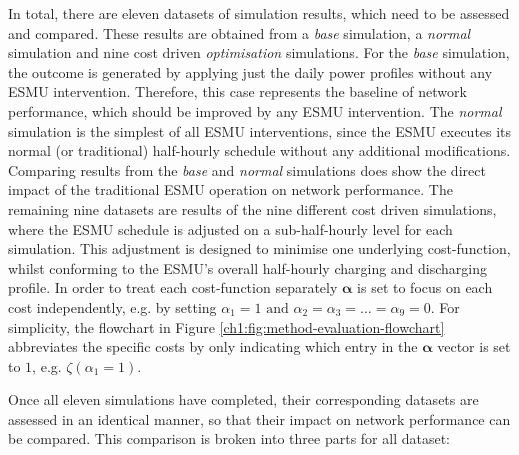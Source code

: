 

In total, there are eleven datasets of simulation results, which need to be assessed and compared.
These results are obtained from a \textit{base} simulation, a \textit{normal} simulation and nine cost driven \textit{optimisation} simulations.
For the \textit{base} simulation, the outcome is generated by applying just the daily power profiles without any ESMU intervention.
Therefore, this case represents the baseline of network performance, which should be improved by any ESMU intervention.
The \textit{normal} simulation is the simplest of all ESMU interventions, since the ESMU executes its normal (or traditional) half-hourly schedule without any additional modifications.
Comparing results from the \textit{base} and \textit{normal} simulations does show the direct impact of the traditional ESMU operation on network performance.
The remaining nine datasets are results of the nine different cost driven simulations, where the ESMU schedule is adjusted on a sub-half-hourly level for each simulation.
This adjustment is designed to minimise one underlying cost-function, whilst conforming to the ESMU's overall half-hourly charging and discharging profile.
In order to treat each cost-function separately $\boldsymbol{\alpha}$ is set to focus on each cost independently, e.g. by setting $\alpha_1 = 1 \text{ and } \alpha_2 = \alpha_3 = \dots = \alpha_9 = 0$.
For simplicity, the flowchart in Figure \ref{ch1:fig:method-evaluation-flowchart} abbreviates the specific costs by only indicating which entry in the $\boldsymbol{\alpha}$ vector is set to $1$, e.g. $\zeta(\alpha_1=1)$.

Once all eleven simulations have completed, their corresponding datasets are assessed in an identical manner, so that their impact on network performance can be compared.
This comparison is broken into three parts for all dataset:

